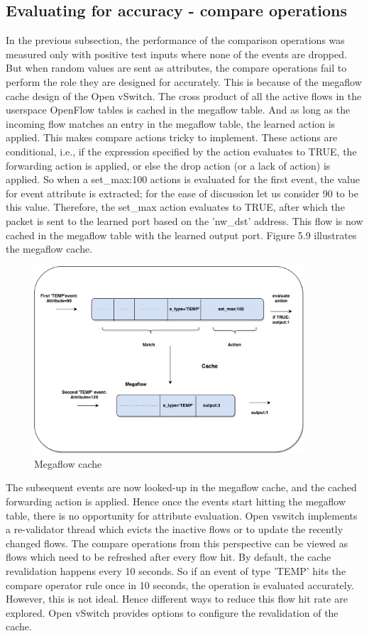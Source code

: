 \subsection{Evaluating for accuracy - compare operations}
In the previous subsection, the performance of the comparison operations was measured only with positive test inputs where none of the events are dropped. But when random values are sent as attributes, the compare operations fail to perform the role they are designed for accurately. This is because of the megaflow cache design of the Open vSwitch. The cross product of all the active flows in the userspace OpenFlow tables is cached in the megaflow table. And as long as the incoming flow matches an entry in the megaflow table, the learned action is applied. This makes compare actions tricky to implement. These actions are conditional, i.e., if the expression specified by the action evaluates to TRUE, the forwarding action is applied, or else the drop action (or a lack of action) is applied. So when a set_max:100 actions is evaluated for the first event, the value for event attribute is extracted; for the ease of discussion let us consider 90 to be this value. Therefore, the set_max action evaluates to TRUE, after which the packet is sent to the learned port based on the 'nw_dst' address. This flow is now cached in the megaflow table with the learned output port. Figure 5.9 illustrates the megaflow cache.
\begin{figure}[H]
 \centering
 \caption{Megaflow cache}
 \includegraphics[height=7cm]{learnandcache.pdf}
\end{figure}
The subsequent events are now looked-up in the megaflow cache, and the cached forwarding action is applied. Hence once the events start hitting the megaflow table, there is no opportunity for attribute evaluation. Open vswitch implements a re-validator thread which evicts the inactive flows or to update the recently changed flows. The compare operations from this perspective can be viewed as flows which need to be refreshed after every flow hit. By default, the cache revalidation happens every 10 seconds. So if an event of type 'TEMP' hits the compare operator rule once in 10 seconds, the operation is evaluated accurately. However, this is not ideal. Hence different ways to reduce this flow hit rate are explored. Open vSwitch provides options to configure the revalidation of the cache.\newline


